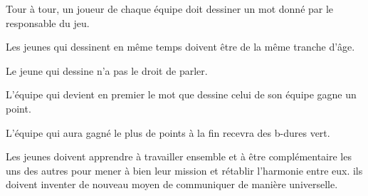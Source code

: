\documentclass{grand-jeu}
\begin{document}
\begin{liste-materiel}
\end{liste-materiel}

\begin{regles}
Tour à tour, un joueur de chaque équipe doit dessiner un mot donné par le responsable du jeu. 

Les jeunes qui dessinent en même temps doivent être de la même tranche d'âge. 

Le jeune qui dessine n'a pas le droit de parler. 

L'équipe qui devient en premier le mot que dessine celui de son équipe gagne un point. 

L’équipe qui aura gagné le plus de points à la fin recevra des b-dures vert.
\end{regles}

\begin{imaginaire}
Les jeunes doivent apprendre à travailler ensemble et à être complémentaire les uns des autres pour mener à bien leur mission et rétablir l'harmonie entre eux. ils doivent inventer de nouveau moyen de communiquer de manière universelle. 
\end{imaginaire}

\begin{moments-stop}
\end{moments-stop}
\end{document}
